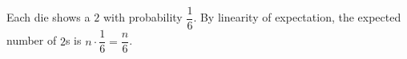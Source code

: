 Each die shows a $2$ with probability $\dfrac16$. By linearity of expectation, the expected number of $2$s is $n\cdot\dfrac16=\boxed{\dfrac n6}$.
